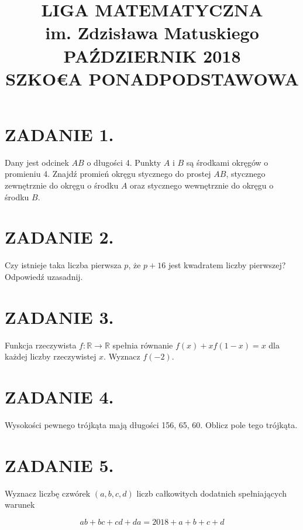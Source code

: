 \documentclass[10pt]{article}
\title{LIGA MATEMATYCZNA \\
 im. Zdzisława Matuskiego \\
 PAŹDZIERNIK 2018 \\
 SZKO€A PONADPODSTAWOWA }
\author{}
\date{}
\begin{document}
\maketitle
\section*{ZADANIE 1.}
Dany jest odcinek \(A B\) o długości 4. Punkty \(A\) i \(B\) są środkami okręgów o promieniu 4. Znajdź promień okręgu stycznego do prostej \(A B\), stycznego zewnętrznie do okręgu o środku \(A\) oraz stycznego wewnętrznie do okręgu o środku \(B\).

\section*{ZADANIE 2.}
Czy istnieje taka liczba pierwsza \(p\), że \(p+16\) jest kwadratem liczby pierwszej? Odpowiedź uzasadnij.

\section*{ZADANIE 3.}
Funkcja rzeczywista \(f: \mathbb{R} \rightarrow \mathbb{R}\) spełnia równanie \(f(x)+x f(1-x)=x\) dla każdej liczby rzeczywistej \(x\). Wyznacz \(f(-2)\).

\section*{ZADANIE 4.}
Wysokości pewnego trójkąta mają długości 156, 65, 60. Oblicz pole tego trójkąta.

\section*{ZADANIE 5.}
Wyznacz liczbę czwórek \((a, b, c, d)\) liczb całkowitych dodatnich spełniających warunek

\[
a b+b c+c d+d a=2018+a+b+c+d
\]
\end{document}
